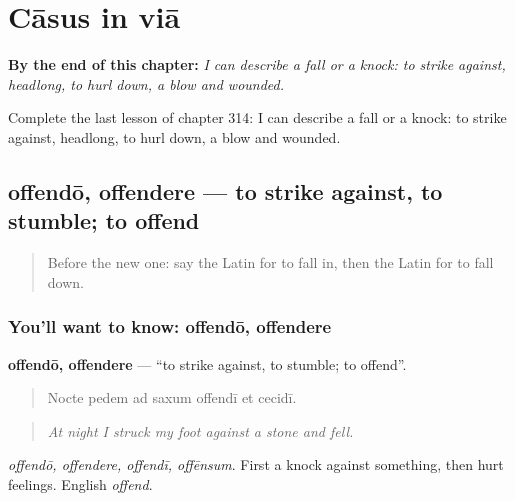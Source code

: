 
\chapter{Cāsus in viā}
\label{ch:la-casus-in-via}

\begin{chapteropening}
\textbf{By the end of this chapter:} \emph{I can describe a fall or a knock: to strike against, headlong, to hurl down, a blow and wounded.}

Complete the last lesson of chapter 314: I can describe a fall or a knock: to strike against, headlong, to hurl down, a blow and wounded.
\end{chapteropening}

\section[offendō, offendere]{offendō, offendere — to strike against, to stumble; to offend}

\label{lesson:LA-C314-offendo}



\begin{quote}
Before the new one: say the Latin for to fall in, then the Latin for to fall down.
\end{quote}

\subsection*{You'll want to know: offendō, offendere}
\textbf{offendō, offendere} — \textquotedblleft{}to strike against, to stumble; to offend\textquotedblright{}.

\begin{quote}
Nocte pedem ad saxum offendī et cecidī.
\end{quote}

\begin{quote}
\emph{At night I struck my foot against a stone and fell.}
\end{quote}

\emph{offendō, offendere, offendī, offēnsum}. First a knock against something, then hurt feelings. English \emph{offend}.

